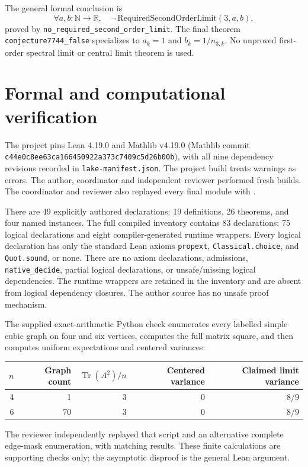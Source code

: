 \documentclass[11pt]{article}
\newcommand{\Tr}{\operatorname{Tr}}
\newcommand{\lean}[1]{\nolinkurl{#1}}
\newcommand{\code}[1]{\texttt{\detokenize{#1}}}
\begin{document}
The general formal conclusion is
\[
 \forall a,b:\mathbb N\to\mathbb R,\quad
 \neg\,\mathrm{RequiredSecondOrderLimit}(3,a,b),
\]
proved by \lean{no_required_second_order_limit}. The final theorem
\lean{conjecture7744_false} specializes to $a_k=1$ and $b_k=1/n_{3,k}$.
No unproved first-order spectral limit or central limit theorem is used.

\section{Formal and computational verification}
The project pins Lean 4.19.0 and Mathlib v4.19.0 (Mathlib commit
\lean{c44e0c8ee63ca166450922a373c7409c5d26b00b}), with all nine dependency
revisions recorded in \lean{lake-manifest.json}. The project build treats
warnings as errors. The author, coordinator and independent reviewer performed fresh builds.
The coordinator and reviewer also replayed every final module with
\code{-DwarningAsError=true}.

There are 49 explicitly authored declarations: 19 definitions, 26 theorems,
and four named instances. The full compiled inventory contains 83 declarations:
75 logical declarations and eight compiler-generated runtime wrappers.
Every logical declaration has only the standard Lean axioms
\lean{propext}, \lean{Classical.choice}, and \lean{Quot.sound}, or none.
There are no axiom declarations, admissions, \lean{native_decide}, partial
logical declarations, or unsafe/missing logical dependencies. The runtime
wrappers are retained in the inventory and are absent from logical dependency
closures. The author source has no unsafe proof mechanism.

The supplied exact-arithmetic Python check enumerates every labelled simple
cubic graph on four and six vertices, computes the full matrix square, and
then computes uniform expectations and centered variances:
\begin{center}
\begin{tabular}{rrrrr}
\toprule
$n$ & Graph count & $\Tr(A^2)/n$ & Centered variance & Claimed limit variance\\
\midrule
4 & 1 & 3 & 0 & $8/9$\\
6 & 70 & 3 & 0 & $8/9$\\
\bottomrule
\end{tabular}
\end{center}
The reviewer independently replayed that script and an alternative complete
edge-mask enumeration, with matching results. These finite calculations are
supporting checks only; the asymptotic disproof is the general Lean argument.
\end{document}

